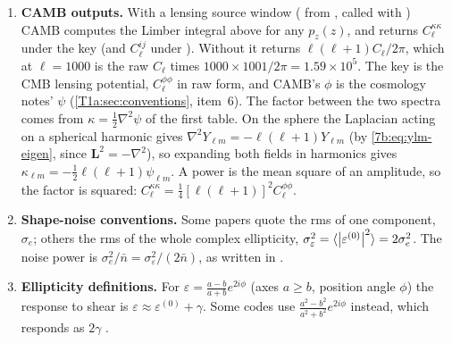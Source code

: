 \begin{enumerate}[leftmargin=1.6em,itemsep=3pt]
\item \textbf{CAMB outputs.} With a lensing source window ( from , called with ) CAMB computes the Limber integral above for any $p_z(z)$, and  returns $C_\ell^{\kappa\kappa}$ under the key  (and $C_\ell^{ij}$ under ). Without  it returns $\ell(\ell+1)C_\ell/2\pi$, which at $\ell=1000$ is the raw $C_\ell$ times $1000\times1001/2\pi=1.59\times10^5$. The key  is the CMB lensing potential, $C_\ell^{\phi\phi}$ in raw form, and CAMB's $\phi$ is the cosmology notes' $\psi$ (\cref{T1a:sec:conventions}, item~6). The factor between the two spectra comes from $\kappa=\frac12\nabla^2\psi$ of the first table. On the sphere the Laplacian acting on a spherical harmonic gives $\nabla^2Y_{\ell m}=-\ell(\ell+1)Y_{\ell m}$ (by \eqref{7b:eq:ylm-eigen}, since $\bm L^2=-\nabla^2$), so expanding both fields in harmonics gives $\kappa_{\ell m}=-\frac12\ell(\ell+1)\psi_{\ell m}$. A power is the mean square of an amplitude, so the factor is squared: $C_\ell^{\kappa\kappa}=\frac14[\ell(\ell+1)]^2C_\ell^{\phi\phi}$.
\item \textbf{Shape-noise conventions.} Some papers quote the rms of one component, $\sigma_e$; others the rms of the whole complex ellipticity, $\sigma_\varepsilon^2=\langle\left\lvert \varepsilon^{(0)}\right\rvert^2\rangle=2\sigma_e^2$. The noise power is $\sigma_e^2/\bar n=\sigma_\varepsilon^2/(2\bar n)$, as written in \cite[eq.~52]{Kilbinger2015}.
\item \textbf{Ellipticity definitions.} For $\varepsilon=\frac{a-b}{a+b}e^{2i\phi}$ (axes $a\ge b$, position angle $\phi$) the response to shear is $\varepsilon\approx\varepsilon^{(0)}+\gamma$. Some codes use $\frac{a^2-b^2}{a^2+b^2}e^{2i\phi}$ instead, which responds as $2\gamma$ \cite[§3.5]{Kilbinger2015}.

\end{enumerate}
